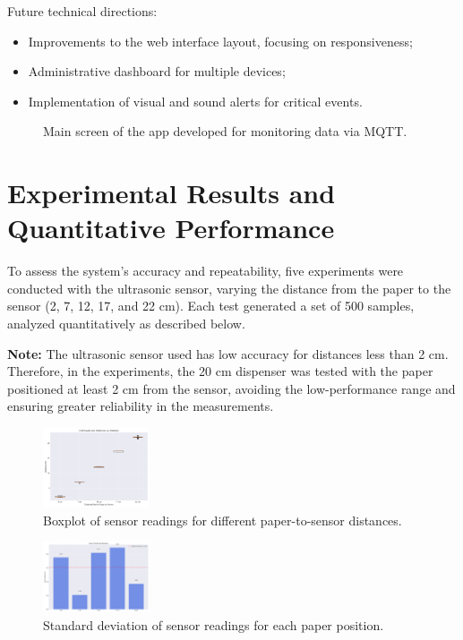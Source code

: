 \documentclass[english,hidelinks]{sbrt}
\begin{document}
Future technical directions:
\begin{itemize}
    \item Improvements to the web interface layout, focusing on responsiveness;
    \item Administrative dashboard for multiple devices;
    \item Implementation of visual and sound alerts for critical events.
\end{itemize}

\begin{figure}[H]
  \centering
  \caption{Main screen of the app developed for monitoring data via MQTT.}
  \label{fig:app}
\end{figure}

\section{Experimental Results and Quantitative Performance}
To assess the system's accuracy and repeatability, five experiments were conducted with the ultrasonic sensor, varying the distance from the paper to the sensor (2, 7, 12, 17, and 22 cm). Each test generated a set of 500 samples, analyzed quantitatively as described below.

\textbf{Note:} The ultrasonic sensor used has low accuracy for distances less than 2 cm. Therefore, in the experiments, the 20 cm dispenser was tested with the paper positioned at least 2 cm from the sensor, avoiding the low-performance range and ensuring greater reliability in the measurements.


\begin{figure}[H]
    \centering
    \includegraphics[width=0.28\textwidth]{graficos/boxplot_distancias.png}
    \caption{Boxplot of sensor readings for different paper-to-sensor distances.}
    \label{fig:boxplot_distancias}
\end{figure}

\begin{figure}[H]
    \centering
    \includegraphics[width=0.28\textwidth]{graficos/desvios_padrao.png}
    \caption{Standard deviation of sensor readings for each paper position.}
    \label{fig:desvios_padrao}
\end{figure}
\end{document}
